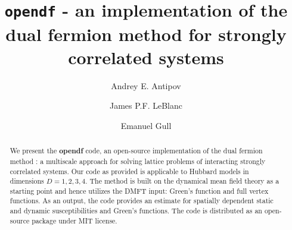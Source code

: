 \documentclass[3p,times,procedia]{elsarticle}
\begin{document}
\begin{frontmatter}




\title{\texttt{opendf} - an implementation of the dual fermion method for strongly correlated systems }




\author[a]{Andrey E. Antipov} 
\author[a]{James P.F. LeBlanc}
\author[a]{Emanuel Gull}

\address[a]{Department of Physics, University of Michigan, Ann Arbor, Michigan 48109, USA}

\begin{abstract}
We present the \textbf{opendf} code, an open-source implementation of the dual fermion method : a multiscale approach for solving lattice problems of interacting strongly correlated systems. Our code as provided is applicable to Hubbard models in dimensions $D=1,2,3,4$. The method is built on the dynamical mean field theory as a starting point and hence utilizes the DMFT input: Green's function and full vertex functions. As an output, the code provides an estimate for spatially dependent static and dynamic susceptibilities and Green's functions. The code is distributed as an open-source package under MIT license. 
\end{abstract}


\end{frontmatter}
\end{document}
